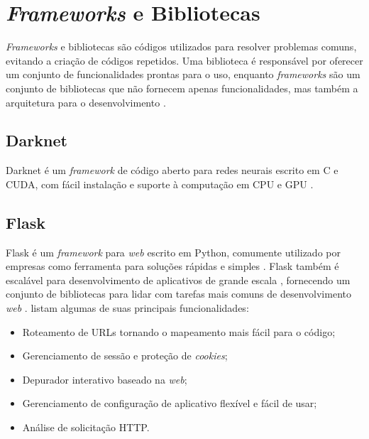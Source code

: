 
\section{\textit{Frameworks} e Bibliotecas} \label{cap:fund-frameworks}
\textit{Frameworks} e bibliotecas são códigos utilizados para resolver problemas comuns, evitando a criação de códigos repetidos. Uma biblioteca é responsável por oferecer um conjunto de funcionalidades prontas para o uso, enquanto \textit{frameworks} são um conjunto de bibliotecas que não fornecem apenas funcionalidades, mas também a arquitetura para o desenvolvimento \cite{ref:Tamenaoul}.


\subsection{Darknet} \label{cap:fund-frameworks-darknet}
Darknet é um \textit{framework} de código aberto para redes neurais escrito em C e CUDA, com fácil instalação e suporte à computação em CPU e GPU \cite{ref:Redmon}.

\subsection{Flask} \label{cap:fund-frameworks-flask}
Flask é um \textit{framework} para \textit{web} escrito em Python, comumente utilizado por empresas como ferramenta para soluções rápidas e simples \cite{ref:Copperwaite-Leifer}.
Flask também é escalável para desenvolvimento de aplicativos de grande escala \cite{ref:Aggarwal}, fornecendo um conjunto de bibliotecas para lidar com tarefas mais comuns de desenvolvimento \textit{web} \cite{ref:Copperwaite-Leifer}.  listam algumas de suas principais funcionalidades:

\begin{itemize}
  \item Roteamento de URLs tornando o mapeamento mais fácil para o código;
  \item Gerenciamento de sessão e proteção de \textit{cookies};
  \item Depurador interativo baseado na \textit{web};
  \item Gerenciamento de configuração de aplicativo flexível e fácil de usar;
  \item Análise de solicitação HTTP.
\end{itemize}
